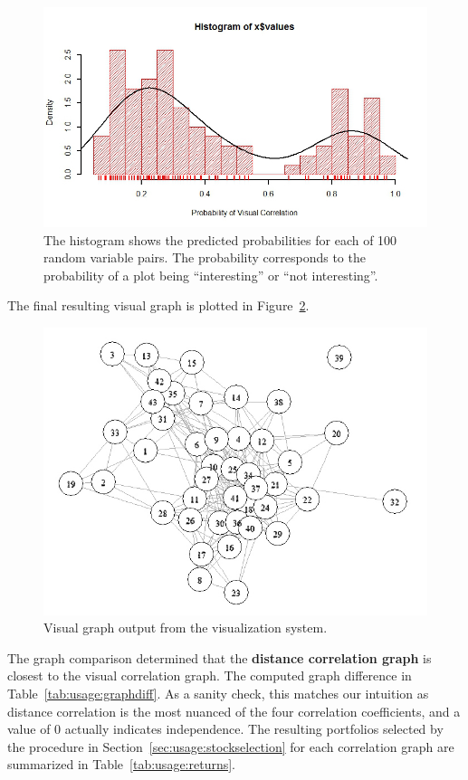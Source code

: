 \begin{figure}[htb]
	\begin{center}
		\includegraphics[width=1\linewidth]
		{ch-usage/figures/predicted_probability_histogram}
		\caption[Histogram of predicted probabilities.]{The histogram shows the 
		predicted probabilities for each of 100 random variable pairs. The 
		probability corresponds to the probability of a plot being 
		``interesting'' or ``not interesting''.}
		\label{fig:usage:hist}
	\end{center}
\end{figure}

\newpage
The final resulting visual graph is plotted in Figure~\ref{fig:usage:visg}. 

\begin{figure}[H]
	\begin{center}
		\includegraphics[width=0.5\linewidth]
		{ch-usage/figures/visgraph}
		\caption[Visual graph output from the visualization system.]{Visual 
		graph output from the visualization system.}
		\label{fig:usage:visg}
	\end{center}
\end{figure}

The graph comparison determined that the \textbf{distance correlation graph} is 
closest to the visual correlation graph. 
The computed graph difference in Table~\ref{tab:usage:graphdiff}.
As a sanity check, this 
matches our intuition as distance correlation is the most nuanced of the four 
correlation coefficients, and a value of 0 actually indicates independence. The 
resulting portfolios selected by the procedure in 
Section~\ref{sec:usage:stockselection} for each correlation graph are 
summarized in Table~\ref{tab:usage:returns}.


